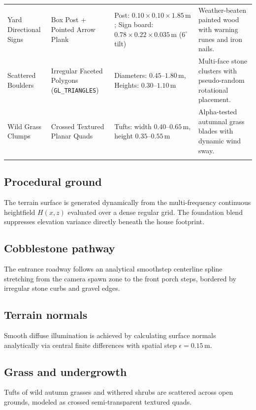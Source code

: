 \documentclass[10pt,a4paper,oneside]{article}
\begin{document}
\begin{longtable}{>{\raggedright\arraybackslash}p{}>{\raggedright\arraybackslash}p{}>{\raggedright\arraybackslash}p{}>{\raggedright\arraybackslash}p{}}
Yard Directional Signs & Box Post + Pointed Arrow Plank & Post: $0.10\times 0.10\times 1.85\,\mathrm{m}$; Sign board: $0.78\times 0.22\times 0.035\,\mathrm{m}$ ($6^\circ$ tilt) & Weather-beaten painted wood with warning runes and iron nails.\\\addlinespace[3pt]

Scattered Boulders & Irregular Faceted Polygons (\texttt{GL\_TRIANGLES}) & Diameters: $0.45\text{--}1.80\,\mathrm{m}$, Heights: $0.30\text{--}1.10\,\mathrm{m}$ & Multi-face stone clusters with pseudo-random rotational placement.\\\addlinespace[3pt]

Wild Grass Clumps & Crossed Textured Planar Quads & Tufts: width $0.40\text{--}0.65\,\mathrm{m}$, height $0.35\text{--}0.55\,\mathrm{m}$ & Alpha-tested autumnal grass blades with dynamic wind sway.\\\addlinespace[3pt]

\bottomrule\end{longtable}

\subsection{Procedural ground}
The terrain surface is generated dynamically from the multi-frequency continuous heightfield $H(x,z)$ evaluated over a dense regular grid. The foundation blend suppresses elevation variance directly beneath the house footprint.

\subsection{Cobblestone pathway}
The entrance roadway follows an analytical smoothstep centerline spline stretching from the camera spawn zone to the front porch steps, bordered by irregular stone curbs and gravel edges.

\subsection{Terrain normals}
Smooth diffuse illumination is achieved by calculating surface normals analytically via central finite differences with spatial step $\epsilon = 0.15\,\mathrm{m}$.

\subsection{Grass and undergrowth}
Tufts of wild autumn grasses and withered shrubs are scattered across open grounds, modeled as crossed semi-transparent textured quads.
\end{document}
